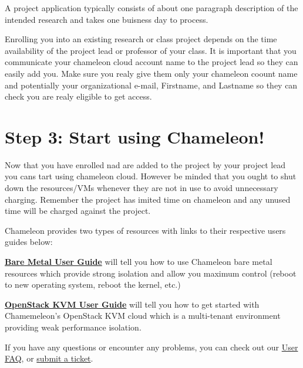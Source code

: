 A project application typically consists of about one paragraph
description of the intended research and takes one buisness day to
process. 

Enrolling you into an existing research or class project depends on
the time availability of the project lead or professor of your
class. It is important that you communicate your chameleon cloud
account name to the project lead so they can easily add you. Make sure
you realy give them only your chameleon coount name and potentially
your organizational e-mail, Firstname, and Lastname so they can check
you are realy eligible to get access.

\section{Step 3: Start using Chameleon!}\label{using-chameleon}

Now that you have enrolled nad are added to the project by your
project lead you cans tart using chameleon cloud. However be minded
that you ought to shut down the resources/VMs whenever they are not in
use to avoid unnecessary charging. Remember the project has imited
time on chameleon and any unused time will be charged against the project.

Chameleon provides two types of resources with links to their respective
users guides below:

\textbf{\href{https://www.chameleoncloud.org/docs/bare-metal-user-guide-old/}{Bare
Metal User Guide}} will tell you how to use Chameleon bare metal
resources which provide strong isolation and allow you maximum control
(reboot to new operating system, reboot the kernel, etc.)

\textbf{\href{https://www.chameleoncloud.org/docs/user-guides/openstack-kvm-user-guide/}{OpenStack
KVM User Guide}} will tell you how to get started with Chamemeleon's
OpenStack KVM cloud which is a multi-tenant environment providing weak
performance isolation. 

If you have any questions or encounter any problems, you can check out
our \href{https://www.chameleoncloud.org/docs/user-faq/}{User FAQ},
or \href{https://www.chameleoncloud.org/user/help/}{submit a ticket}.

